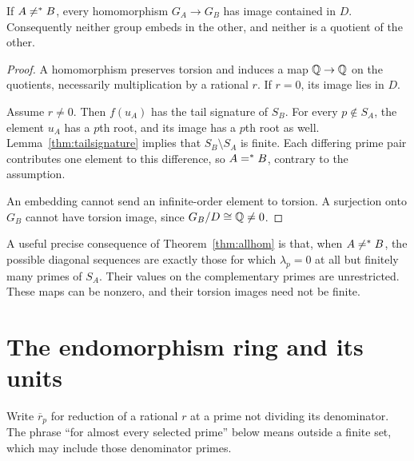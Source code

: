 \begin{theorem}
\label{thm:homobstruction}
If $A\ne^{*} B$, every homomorphism $G_A\to G_B$ has image contained in $D$. Consequently neither group embeds in the other, and neither is a quotient of the other.
\end{theorem}
\begin{proof}
A homomorphism preserves torsion and induces a map $\mathbb Q\to\mathbb Q$ on the quotients, necessarily multiplication by a rational $r$. If $r=0$, its image lies in $D$.

Assume $r\ne0$. Then $f(u_A)$ has the tail signature of $S_B$. For every $p\notin S_A$, the element $u_A$ has a $p$th root, and its image has a $p$th root as well. Lemma~\ref{thm:tailsignature} implies that $S_B\setminus S_A$ is finite. Each differing prime pair contributes one element to this difference, so $A=^{*} B$, contrary to the assumption.

An embedding cannot send an infinite-order element to torsion. A surjection onto $G_B$ cannot have torsion image, since $G_B/D\cong\mathbb Q\ne0$.
\end{proof}
A useful precise consequence of Theorem~\ref{thm:allhom} is that, when $A\ne^{*} B$, the possible diagonal sequences are exactly those for which $\lambda_p=0$ at all but finitely many primes of $S_A$. Their values on the complementary primes are unrestricted. These maps can be nonzero, and their torsion images need not be finite.

\section{The endomorphism ring and its units}
Write $\overline r_p$ for reduction of a rational $r$ at a prime not dividing its denominator. The phrase ``for almost every selected prime'' below means outside a finite set, which may include those denominator primes.

